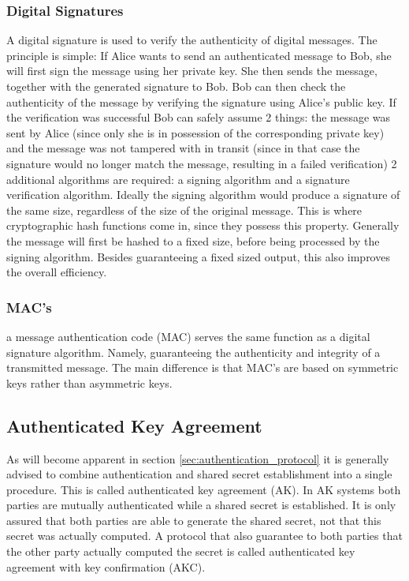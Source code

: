 \documentclass[11pt]{article}
\begin{document}
\subsubsection{Digital Signatures} A digital signature is used to verify the authenticity of digital messages. The principle is simple: If Alice wants to send an authenticated message to Bob, she will first sign the message using her private key. She then sends the message, together with the generated signature to Bob. Bob can then check the authenticity of the message by verifying the signature using Alice's public key. If the verification was successful Bob can safely assume 2 things: the message was sent by Alice (since only she is in possession of the corresponding private key) and the message was not tampered with in transit (since in that case the signature would no longer match the message, resulting in a failed verification) 2 additional algorithms are required: a signing algorithm and a signature verification algorithm. Ideally the signing algorithm would produce a signature of the same size, regardless of the size of the original message. This is where cryptographic hash functions come in, since they possess this property. Generally the message will first be hashed to a fixed size, before being processed by the signing algorithm. Besides guaranteeing a fixed sized output, this also improves the overall efficiency.\cite{DigitalSignaturewiki}

\subsubsection{MAC's} a message authentication code (MAC) serves the same function as a digital signature algorithm. Namely, guaranteeing the authenticity and integrity of a transmitted message. The main difference is that MAC's are based on symmetric keys rather than asymmetric keys. 

\subsection{Authenticated Key Agreement}
\label{sec:AK}

As will become apparent in section \ref{sec:authentication_protocol} it is generally advised to combine authentication and shared secret establishment into a single procedure. This is called authenticated key agreement (AK). In AK systems both parties are mutually authenticated while a shared secret is established. It is only assured that both parties are able to generate the shared secret, not that this secret was actually computed. A protocol that also guarantee to both parties that the other party actually computed the secret is called authenticated key agreement with key confirmation (AKC).\cite{Blake-Wilson}
\end{document}
